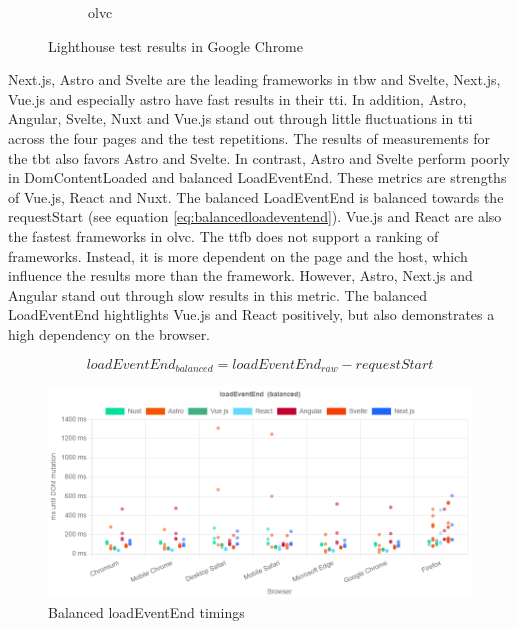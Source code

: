 \documentclass[a4paper, 12pt]{article}
\begin{document}
\begin{figure}[!h]
\begin{subfigure}{0.49\linewidth}
\begin{center}
    \end{center}
    \caption{\acrfull{olvc}}\label{subfig:LH:observedLastVisualChange}
  \end{subfigure}
  \caption{Lighthouse test results in Google Chrome}\label{fig:lighthouseResults}
\end{figure}

Next.js, Astro and Svelte are the leading frameworks in \acrshort{tbw} and Svelte, Next.js, Vue.js and especially astro have fast results in their \acrshort{tti}.
In addition, Astro, Angular, Svelte, Nuxt and Vue.js stand out through little fluctuations in \acrshort{tti} across the four pages and the test repetitions.
The results of measurements for the \acrshort{tbt} also favors Astro and Svelte.
In contrast, Astro and Svelte perform poorly in DomContentLoaded and balanced LoadEventEnd.
These metrics are strengths of Vue.js, React and Nuxt.
The balanced LoadEventEnd is balanced towards the requestStart (see equation \ref{eq:balancedloadeventend}).
Vue.js and React are also the fastest frameworks in \acrshort{olvc}.
The \acrshort{ttfb} does not support a ranking of frameworks.
Instead, it is more dependent on the page and the host, which influence the results more than the framework.
However, Astro, Next.js and Angular stand out through slow results in this metric.
The balanced LoadEventEnd hightlights Vue.js and React positively, but also demonstrates a high dependency on the browser.

\begin{equation}\label{eq:balancedloadeventend}
\mathit{loadEventEnd}_\mathit{balanced} = \mathit{loadEventEnd}_\mathit{raw} - \mathit{requestStart}
\end{equation}

\begin{figure}
  \centering
  \includegraphics[width=0.8\linewidth, keepaspectratio]{img/playwright-results/loadEventEnd_balanced/total.png}
  \caption{Balanced loadEventEnd timings}
  \label{fig:Playwright:loadEventEnd}
\end{figure}
\end{document}
